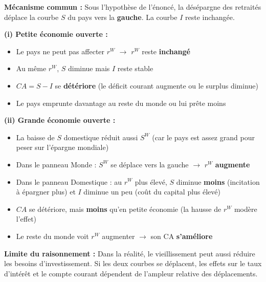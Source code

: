 \begin{reponse}
\textbf{Mécanisme commun :} Sous l'hypothèse de l'énoncé, la désépargne des retraités déplace la courbe $S$ du pays vers la \textbf{gauche}. La courbe $I$ reste inchangée.

\textbf{(i) Petite économie ouverte :}
\begin{itemize}
   \item Le pays ne peut pas affecter $r^W$ $\to$ $r^W$ reste \textbf{inchangé}
   \item Au même $r^W$, $S$ diminue mais $I$ reste stable
   \item $CA = S - I$ se \textbf{détériore} (le déficit courant augmente ou le surplus diminue)
   \item Le pays emprunte davantage au reste du monde ou lui prête moins
\end{itemize}

\textbf{(ii) Grande économie ouverte :}
\begin{itemize}
   \item La baisse de $S$ domestique réduit aussi $S^W$ (car le pays est assez grand pour peser sur l'épargne mondiale)
   \item Dans le panneau Monde : $S^W$ se déplace vers la gauche $\to$ $r^W$ \textbf{augmente}
   \item Dans le panneau Domestique : au $r^W$ plus élevé, $S$ diminue \textbf{moins} (incitation à épargner plus) et $I$ diminue un peu (coût du capital plus élevé)
   \item $CA$ se détériore, mais \textbf{moins} qu'en petite économie (la hausse de $r^W$ modère l'effet)
   \item Le reste du monde voit $r^W$ augmenter $\to$ son CA \textbf{s'améliore}
\end{itemize}

\textbf{Limite du raisonnement :} Dans la réalité, le vieillissement peut aussi réduire les besoins d'investissement. Si les deux courbes se déplacent, les effets sur le taux d'intérêt et le compte courant dépendent de l'ampleur relative des déplacements.
\end{reponse}


